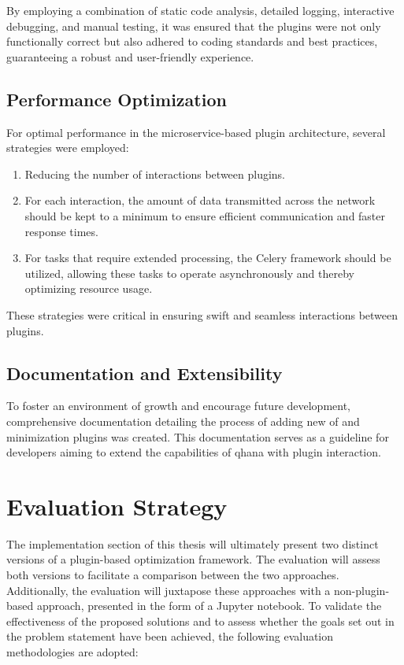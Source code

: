 \documentclass[
  a4paper,  %
  twoside,  %
  bibliography=totoc,
  headsepline,
  cleardoublepage=empty,
  parskip=half,
  draft=false
]{scrbook}
\begin{document}
By employing a combination of static code analysis, detailed logging, interactive debugging, and manual testing, it was ensured that the plugins were not only functionally correct but also adhered to coding standards and best practices, guaranteeing a robust and user-friendly experience.


\subsection{Performance Optimization}
For optimal performance in the microservice-based plugin architecture, several strategies were employed:

\begin{enumerate}
    \item Reducing the number of interactions between plugins.
    \item For each interaction, the amount of data transmitted across the network should be kept to a minimum to ensure efficient communication and faster response times.
    \item For tasks that require extended processing, the Celery framework should be utilized, allowing these tasks to operate asynchronously and thereby optimizing resource usage.
\end{enumerate}

These strategies were critical in ensuring swift and seamless interactions between plugins.


\subsection{Documentation and Extensibility}
To foster an environment of growth and encourage future development, comprehensive documentation detailing the process of adding new \gls{of} and minimization plugins was created.
This documentation serves as a guideline for developers aiming to extend the capabilities of \gls{qhana} with plugin interaction.


\section{Evaluation Strategy}
\label{sec:evaluationStrategy}

The implementation section of this thesis will ultimately present two distinct versions of a plugin-based optimization framework.
The evaluation will assess both versions to facilitate a comparison between the two approaches.
Additionally, the evaluation will juxtapose these approaches with a non-plugin-based approach, presented in the form of a Jupyter notebook.
To validate the effectiveness of the proposed solutions and to assess whether the goals set out in the problem statement have been achieved, the following evaluation methodologies are adopted:
\end{document}
